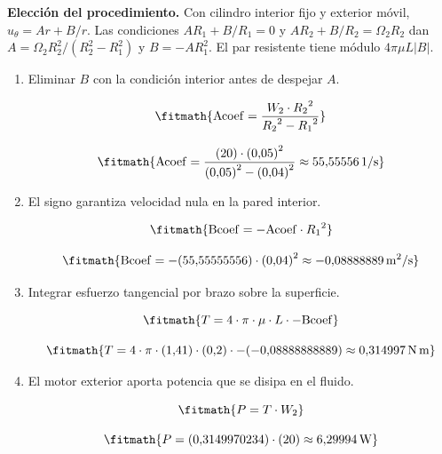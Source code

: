 \noindent\textbf{Elección del procedimiento.} Con cilindro interior fijo y exterior móvil, $u_\theta=Ar+B/r$. Las condiciones $AR_1+B/R_1=0$ y $AR_2+B/R_2=\Omega_2R_2$ dan $A=\Omega_2R_2^2/(R_2^2-R_1^2)$ y $B=-AR_1^2$. El par resistente tiene módulo $4\pi\mu L|B|$.

\begin{enumerate}

\item Eliminar $B$ con la condición interior antes de despejar $A$.

\[\fitmath{\mathrm{Acoef}=\frac{W_{2}\cdot {R_{2}}^{2}}{{R_{2}}^{2}-{R_{1}}^{2}}}\]

\[\fitmath{\mathrm{Acoef}=\frac{(20)\cdot {(0{,}05)}^{2}}{{(0{,}05)}^{2}-{(0{,}04)}^{2}}\approx 55{,}55556\,\mathrm{1/s}}\]

\item El signo garantiza velocidad nula en la pared interior.

\[\fitmath{\mathrm{Bcoef}=-\mathrm{Acoef}\cdot {R_{1}}^{2}}\]

\[\fitmath{\mathrm{Bcoef}=-(55{,}55555556)\cdot {(0{,}04)}^{2}\approx -0{,}08888889\,\mathrm{m^{2}/s}}\]

\item Integrar esfuerzo tangencial por brazo sobre la superficie.

\[\fitmath{T=4\cdot \pi\cdot \mu\cdot L\cdot -\mathrm{Bcoef}}\]

\[\fitmath{T=4\cdot \pi\cdot (1{,}41)\cdot (0{,}2)\cdot -(-0{,}08888888889)\approx 0{,}314997\,\mathrm{N\,m}}\]

\item El motor exterior aporta potencia que se disipa en el fluido.

\[\fitmath{P=T\cdot W_{2}}\]

\[\fitmath{P=(0{,}3149970234)\cdot (20)\approx 6{,}29994\,\mathrm{W}}\]

\end{enumerate}
